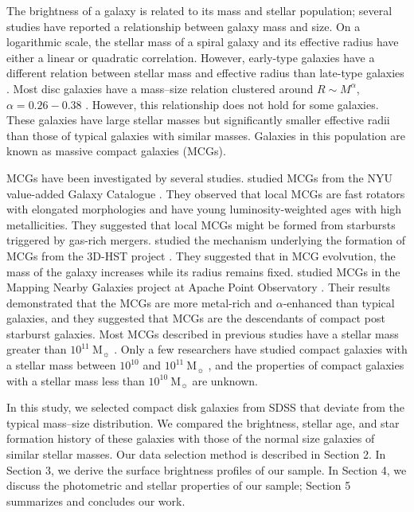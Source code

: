\documentclass[fleqn,usenatbib]{mnras}
\begin{document}
The brightness of a galaxy is related to its mass and stellar population; several studies have reported a relationship between galaxy mass and size.
On a logarithmic scale, the stellar mass of a spiral galaxy and its effective radius have either a linear \citep[e.g.][]{2010MNRAS.406.1595F,2018MNRAS.473.5468W} or quadratic \citep{2013MNRAS.434..325F} correlation.
However, early-type galaxies have a different relation between stellar mass and effective radius than late-type galaxies \citep{2013MNRAS.434..325F,2014ApJ...788...28V}.
Most disc galaxies have a mass--size relation clustered around $R \sim M^\alpha$, $\alpha = 0.26-0.38$ \citep[e.g.][]{2010ApJ...722L.120F,2018MNRAS.473.5468W}.
However, this relationship does not hold for some galaxies.
These galaxies have large stellar masses but significantly smaller effective radii than those of typical galaxies with similar masses.
Galaxies in this population are known as massive compact galaxies (MCGs).

MCGs have been investigated by several studies.
\citet{2012MNRAS.423..632F} studied MCGs from the NYU value-added Galaxy Catalogue \citep{2005AJ....129.2562B}.
They observed that local MCGs are fast rotators with elongated morphologies and have young luminosity-weighted ages with high metallicities.
They suggested that local MCGs might be formed from starbursts triggered by gas-rich mergers.
\citet{2015ApJ...813...23V} studied the mechanism underlying the formation of MCGs from the 3D-HST project \citep{2011ApJ...743L..15V,2012ApJS..200...13B}.
They suggested that in MCG evolvution, the mass of the galaxy increases while its radius remains fixed.
\citet{2021MNRAS.507..300S} studied MCGs in the Mapping Nearby Galaxies project at Apache Point Observatory \citep[MaNGA,][]{2015ApJ...798....7B}.
Their results demonstrated that the MCGs are more metal-rich and $\alpha$-enhanced than typical galaxies, and they suggested that MCGs are the descendants of compact post starburst galaxies.
Most MCGs described in previous studies have a stellar mass greater than $10^{11}~\mathrm{M}_{\sun}$ \citep[e.g.][]{2012ApJS..200...13B,2015ApJ...813...23V}.
Only a few researchers have studied compact galaxies with a stellar mass between $10^{10}$ and $10^{11}~\mathrm{M_{\sun}}$ \citep[][]{2021MNRAS.507..300S}, and the properties of compact galaxies with a stellar mass less than $10^{10}~\mathrm{M_{\sun}}$ are unknown.

In this study, we selected compact disk galaxies from SDSS that deviate from the typical mass--size distribution.
We compared the brightness, stellar age, and star formation history of these galaxies with those of the normal size galaxies of similar stellar masses.
Our data selection method is described in Section 2.
In Section 3, we derive the surface brightness profiles of our sample.
In Section 4, we discuss the photometric and stellar properties of our sample; Section 5 summarizes and concludes our work.
\end{document}

